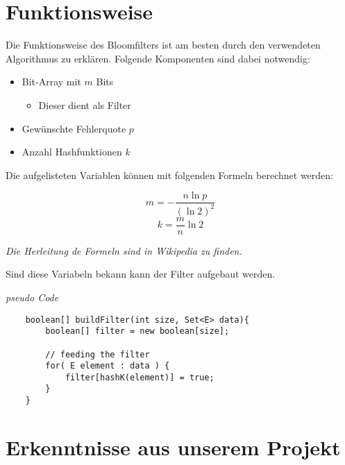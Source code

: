 \documentclass{article}
\begin{document}
\section{Funktionsweise}
Die Funktionsweise des Bloomfilters ist am besten durch den verwendeten Algorithmus zu erklären. Folgende Komponenten sind dabei notwendig:

\begin{itemize}
    \item Bit-Array mit $m$ Bits 
        \begin{itemize}
            \item{Dieser dient als Filter}
        \end{itemize}
    \item Gewünschte Fehlerquote $p$
    \item Anzahl Hashfunktionen $k$
\end{itemize}

Die aufgelisteten Variablen können mit folgenden Formeln berechnet werden:

\begin{equation}
    m = -\frac{n \ln{p}}{(\ln{2})^2}
\end{equation}
\begin{equation}
    k = \frac{m}{n} \ln{2}
\end{equation}
\begin{center}
    \textit{Die Herleitung de Formeln sind in Wikipedia zu finden.}
\end{center}
Sind diese Variabeln bekann kann der Filter aufgebaut werden.
\begin{center}
    \textit{pseudo Code}
\end{center}
\begin{lstlisting}
    boolean[] buildFilter(int size, Set<E> data){
        boolean[] filter = new boolean[size];
    
        // feeding the filter
        for( E element : data ) {
            filter[hashK(element)] = true;
        }
    }
\end{lstlisting}


\section{Erkenntnisse aus unserem Projekt}
\end{document}
